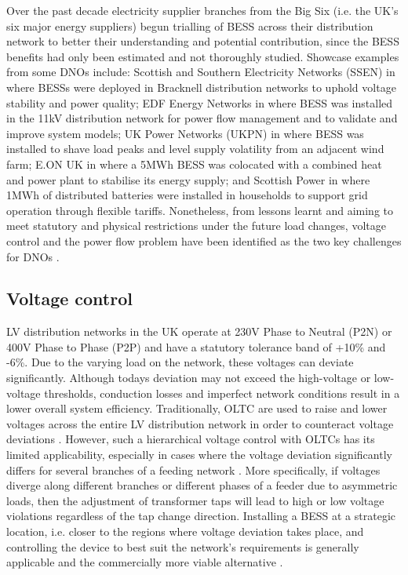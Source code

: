 Over the past decade electricity supplier branches from the Big Six (i.e. the UK's six major energy suppliers) begun trialling of BESS across their distribution network to better their understanding and potential contribution, since the BESS benefits had only been estimated and not thoroughly studied.
Showcase examples from some DNOs include:
Scottish and Southern Electricity Networks (SSEN) in \cite{NTVV2016} where BESSs were deployed in Bracknell distribution networks to uphold voltage stability and power quality;
EDF Energy Networks in \cite{Wade2010} where BESS was installed in the 11kV distribution network for power flow management and to validate and improve system models;
UK Power Networks (UKPN) in \cite{Lyons2015a} where BESS was installed to shave load peaks and level supply volatility from an adjacent wind farm;
E.ON UK in \cite{EON2017} where a 5MWh BESS was colocated with a combined heat and power plant to stabilise its energy supply;
and Scottish Power in \cite{ScottishPower2016} where 1MWh of distributed batteries were installed in households to support grid operation through flexible tariffs.
Nonetheless, from lessons learnt and aiming to meet statutory and physical restrictions under the future load changes, voltage control and the power flow problem have been identified as the two key challenges for DNOs \cite{Ferreira2013a, Shi2015}.

\subsection{Voltage control}

LV distribution networks in the UK operate at 230V Phase to Neutral (P2N) or 400V Phase to Phase (P2P) and have a statutory tolerance band of +10\% and -6\%.
Due to the varying load on the network, these voltages can deviate significantly.
Although todays deviation may not exceed the high-voltage or low-voltage thresholds, conduction losses and imperfect network conditions result in a lower overall system efficiency.
Traditionally, OLTC are used to raise and lower voltages across the entire LV distribution network in order to counteract voltage deviations \cite{Sun2009}.
However, such a hierarchical voltage control with OLTCs has its limited applicability, especially in cases where the voltage deviation significantly differs for several branches of a feeding network \cite{Zangs2016}.
More specifically, if voltages diverge along different branches or different phases of a feeder due to asymmetric loads, then the adjustment of transformer taps will lead to high or low voltage violations regardless of the tap change direction.
Installing a BESS at a strategic location, i.e. closer to the regions where voltage deviation takes place, and controlling the device to best suit the network's requirements is generally applicable and the commercially more viable alternative \cite{Liserre2010}.

